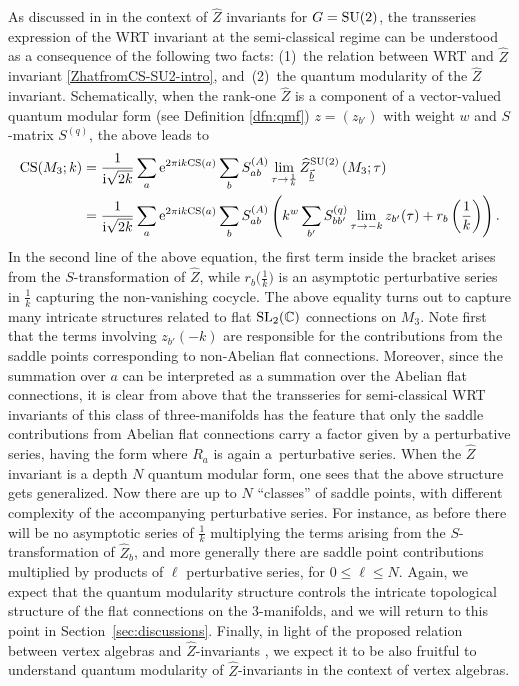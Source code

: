 \documentclass[10pt,a4paper]{amsart}
\newcommand{\Zhlong}[3]{\ensuremath{\widehat{Z}^{#1}_{#2}\left(#3;\tau\right)}}
\def\bv{{\vec{\underline{b}}}}
\theoremstyle{definition}
\numberwithin{equation}{section}
\begin{document}
As discussed in \cite{cheng20193d} in the context of $\widehat Z$ invariants for $G={\rm SU}(2)$, the transseries expression of the WRT invariant at the semi-classical regime can be understood as a consequence of the following two facts: (1)~the relation between WRT and $\widehat Z$ invariant \eqref{ZhatfromCS-SU2-intro}, and~(2)~the quantum modularity of the $\widehat Z$ invariant. Schematically, when the rank-one $\widehat Z$ is a component of a vector-valued quantum modular form (see Definition \ref{dfn:qmf}) $z=(z_{b'})$ with weight $w$ and $S$-matrix $S^{(q)}$, the above leads to
\begin{align}
 \mathrm{CS}(M_3; k)& ={\frac{1}{{\rm i}\sqrt{2k}}} \sum_{a }{\rm e}^{2\pi {\rm i} k {\rm CS}(a)}\sum_b S^{(A)}_{ab} \lim_{\tau\to {\frac{1}{ k}}} \Zhlong{{\rm SU}(2)}{\bv}{M_3} \nonumber \\
 &={\frac{1}{{\rm i}\sqrt{2k}}}
 \sum_{a } {\rm e}^{2\pi {\rm i} k {\rm CS}(a)}\sum_b S^{(A)}_{ab} \left( k^w \sum_{b'} S^{(q)}_{bb'} \lim_{\tau\to {-k}}z_{b'}(\tau) + r_b\left(\frac{1}{ k}\right)\right).\label{CS_transseries}
\end{align}
In the second line of the above equation, the first term inside the bracket arises from the $S$-transformation of $\widehat Z$, while $r_b\bigl(\tfrac{1}{ k}\bigr)$ is an asymptotic perturbative series in $\tfrac{1}{ k}$ capturing the non-vanishing cocycle. The above equality turns out to capture many intricate structures related to flat ${\rm SL}_2({\mathbb C})$ connections on $M_3$. Note first that the terms involving $z_{b'}(-k)$ are responsible for the contributions from the saddle points corresponding to {non-Abelian} flat connections. Moreover, since the summation over $a$ can be interpreted as a summation over the Abelian flat connections, it is clear from above that the transseries for semi-classical WRT invariants of this class of three-manifolds has the feature that only the saddle contributions from Abelian flat connections carry a factor given by a perturbative series, having the form  where $R_a$ is again a~perturbative series. When the $\widehat Z$ invariant is a depth $N$ quantum modular form, one sees that the above structure gets generalized. Now there are up to $N$ ``classes'' of saddle points, with different complexity of the accompanying perturbative series. For instance, as before there will be no asymptotic series of $\tfrac{1}{k}$ multiplying the terms arising from the $S$-transformation of $\widehat Z_b$, and more generally there are saddle point contributions multiplied by products of $\ell$ perturbative series, for $0\leq \ell \leq N$. Again, we expect that the quantum modularity structure controls the intricate topological structure of the flat connections on the 3-manifolds, and we will return to this point in Section~\ref{sec:discussions}. Finally, in light of the proposed relation between vertex algebras and $\widehat Z$-invariants \cite{chengUpC,cheng20193d}, we expect it to be also fruitful to understand quantum modularity of $\widehat Z$-invariants in the context of vertex algebras.
\end{document}
